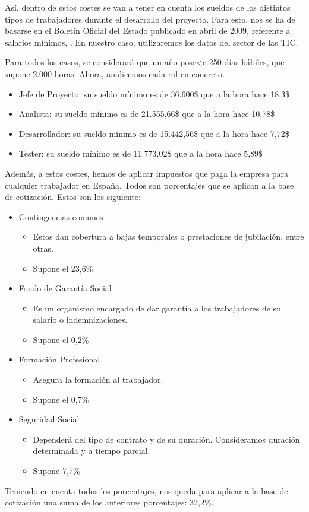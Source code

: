 Así, dentro de estos costes se van a tener en cuenta los sueldos de los distintos tipos de trabajadores durante el desarrollo del proyecto. Para esto, nos se ha de basarse en el Boletín Oficial del Estado publicado en abril de 2009, referente a salarios mínimos, \cite{boe_salarios}. En nuestro caso, utilizaremos los datos del sector de las TIC.

Para todos los casos, se considerará que un año pose<e 250 días hábiles, que supone 2.000 horas. Ahora, analicemos cada rol en concreto.

\begin{itemize}
    \item Jefe de Proyecto: su sueldo mínimo es de 36.600\$ que a la hora hace 18,3\$
    \item Analista: su sueldo mínimo es de 21.555,66\$ que a la hora hace 10,78\$
    \item Desarrollador: su sueldo mínimo es de 15.442,56\$ que a la hora hace 7,72\$
    \item Tester: su sueldo mínimo es de 11.773,02\$ que a la hora hace 5,89\$
\end{itemize}

Además, a estos costes, hemos de aplicar impuestos que paga la empresa para cualquier trabajador en España. Todos son porcentajes que se aplican a la base de cotización. Estos son los siguiente:
\begin{itemize}
    \item Contingencias comunes
    \begin{itemize}
        \item Estos dan cobertura a bajas temporales o prestaciones de jubilación, entre otras.
        \item Supone el 23,6\%
    \end{itemize}
    \item Fondo de Garantía Social
    \begin{itemize}
        \item Es un organismo encargado de dar garantía a los trabajadores de su salario o indemnizaciones.
        \item Supone el 0,2\%
    \end{itemize}
    \item Formación Profesional
    \begin{itemize}
        \item Asegura la formación al trabajador.
        \item Supone el 0,7\%
    \end{itemize}
    \item Seguridad Social
    \begin{itemize}
        \item Dependerá del tipo de contrato y de su duración. Consideramos duración determinada y a tiempo parcial.
        \item Supone 7,7\%
    \end{itemize}
\end{itemize}

Teniendo en cuenta todos los porcentajes, nos queda para aplicar a la base de cotización una suma de los anteriores porcentajes: 32,2\%.
